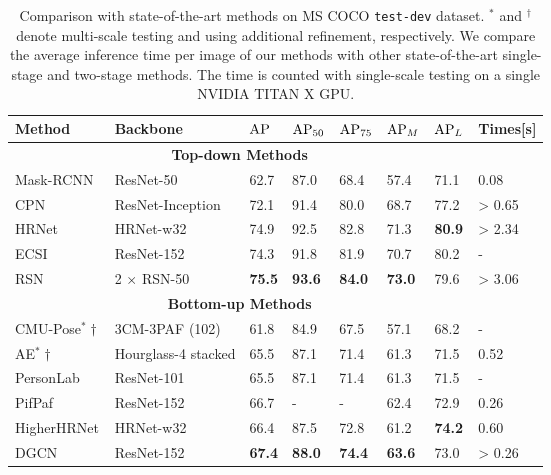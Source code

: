 \documentclass[sigconf]{acmart}
\begin{document}
\begin{table*}[ht]
\renewcommand{\arraystretch}{1.0}
  \caption{Comparison with state-of-the-art methods on MS COCO \texttt{test-dev} dataset. $^\ast$ and $^\dag$ denote multi-scale testing and using additional refinement, respectively.
  We compare the average inference time per image of our methods with other state-of-the-art single-stage and two-stage methods. The time is counted with single-scale testing on a single NVIDIA TITAN X GPU.
  }
  \label{tab:sota}
  \begin{tabular}{p{110 pt}<{\centering}p{110 pt}<{\centering}p{30 pt}<{\centering}p{30 pt}<{\centering}p{30 pt}<{\centering}p{30 pt}<{\centering}p{30 pt}<{\centering}p{30 pt}<{\centering}}
    \toprule
    Method & Backbone & ${\rm AP}$ & ${\rm AP}_{50}$ & ${\rm AP}_{75}$ & ${\rm AP}_{M}$ & ${\rm AP}_{L}$ & Times[s]\\
    \midrule
    \multicolumn{7}{c}{\textbf{Top-down Methods}} \\
    \midrule
    Mask-RCNN \cite{he2017mask} & ResNet-50 & 62.7 & 87.0 & 68.4 & 57.4 & 71.1 & 0.08\\
    CPN \cite{chen2018cascaded} & ResNet-Inception & 72.1 & 91.4 & 80.0 & 68.7 & 77.2 & > 0.65\\
    HRNet \cite{sun2019deep} &  HRNet-w32 &  74.9 &  92.5 &  82.8 &  71.3 &  \textbf{80.9} &  > 2.34\\
ECSI \cite{su2019multi} &  ResNet-152 & 74.3 & 91.8 & 81.9 & 70.7 &  80.2 & -\\
    RSN \cite{cai2020learning} &  2 $\times$ RSN-50 &  \textbf{75.5} &  \textbf{93.6} &  \textbf{84.0} &  \textbf{73.0} &  79.6 &  > 3.06\\
    \midrule
    \multicolumn{7}{c}{\textbf{Bottom-up Methods}} \\
    \midrule
    CMU-Pose$^\ast\dag$ \cite{cao2017realtime} & 3CM-3PAF (102) & 61.8 & 84.9 & 67.5 & 57.1 & 68.2 &-\\
    AE$^\ast\dag$ \cite{newell2016associative} & Hourglass-4 stacked & 65.5 & 87.1 & 71.4 & 61.3 & 71.5 & 0.52\\
    PersonLab \cite{papandreou2018personlab} & ResNet-101 & 65.5 & 87.1 & 71.4 & 61.3 & 71.5 &-\\
    PifPaf \cite{kreiss2019pifpaf} & ResNet-152 & 66.7 & - & - & 62.4 & 72.9 & 0.26\\
    HigherHRNet \cite{cheng2020higherhrnet} &  HRNet-w32 & 66.4 &  87.5 & 72.8 & 61.2 &  \textbf{74.2} &  0.60\\
DGCN \cite{qiu2020dgcn} & ResNet-152 &  \textbf{67.4} &  \textbf{88.0} &  \textbf{74.4} &  \textbf{63.6} & 73.0 & > 0.26\\

\end{tabular}
\end{table*}
\end{document}
